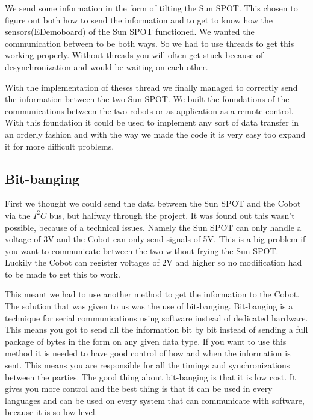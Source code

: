 \documentclass[a4paper,10pt]{article} %
\begin{document}
We send some information in the form of tilting the Sun SPOT. This chosen to
figure out both how to send the information and to get to know how the
sensors(EDemoboard) of the Sun SPOT functioned. We wanted the communication
between to be both ways. So we had to use threads to get this working properly.
Without threads you will often get stuck because of desynchronization and would
be waiting on each other.

With the implementation of theses thread we finally managed to correctly send
the information between the two Sun SPOT. We built the foundations of the
communications between the two robots or as application as a remote control.
With this foundation it could be used to implement any sort of data transfer in
an orderly fashion and with the way we made the code it is very easy too expand
it for more difficult problems.


\subsection{Bit-banging} %
\label{subsec:bitbang}


First we thought we could send the data between the Sun SPOT and the Cobot via
the $I^2C$ bus, but halfway through the project. It was found out this wasn't
possible, because of a technical issues. Namely the Sun SPOT can only handle a
voltage of 3V and the Cobot can only send signals of 5V. This is a big problem
if you want to communicate between the two without frying the Sun SPOT. Luckily
the Cobot can register voltages of 2V and higher so no modification had to be
made to get this to work.

This meant we had to use another method to get the information to the Cobot. The
solution that was given to us was the use of bit-banging. Bit-banging is a
technique for serial communications using software instead of dedicated
hardware. This means you got to send all the information bit by bit instead of
sending a full package of bytes in the form on any given data type. If you want
to use this method it is needed to have good control of how and when the
information is sent. This means you are responsible for all the timings and
synchronizations between the parties. The good thing about bit-banging is that
it is low cost. It gives you more control and the best thing is that it can be
used in every languages and can be used on every system that can communicate
with software, because it is so low level.
\end{document}
